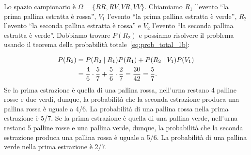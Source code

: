 \begin{solu}
Lo spazio campionario è $\Omega = \{RR, RV, VR, VV\}$. Chiamiamo $R_1$ l'evento \enquote{la prima pallina estratta è rossa}, $V_1$ l'evento \enquote{la prima pallina estratta è verde}, $R_2$ l'evento \enquote{la seconda pallina estratta è rossa} e $V_2$ l'evento \enquote{la seconda pallina estratta è verde}. 
Dobbiamo trovare $P(R_2)$ e possiamo risolvere il problema usando il teorema della probabilità totale~\eqref{eq:prob_total_1b}:

\begin{align}
P(R_2) &= P(R_2 \mid R_1) P(R_1) + P(R_2 \mid V_1)P(V_1)\notag\\
&= \frac{4}{6} \cdot \frac{5}{7} + \frac{5}{6} \cdot \frac{2}{7} = \frac{30}{42} = \frac{5}{7}.\notag
\end{align}
Se la prima estrazione è quella di una pallina rossa, nell'urna restano 4 palline rosse e due verdi, dunque, la probabilità che la seconda estrazione produca una  pallina rossa è uguale a 4/6.
La probabilità di una pallina rossa nella prima estrazione è 5/7.
Se la prima estrazione è quella di una pallina verde, nell'urna restano 5 palline rosse e una pallina verde, dunque, la probabilità che la seconda estrazione produca una pallina rossa è uguale a 5/6.
La probabilità di una pallina verde nella prima estrazione è 2/7.
\end{solu}


